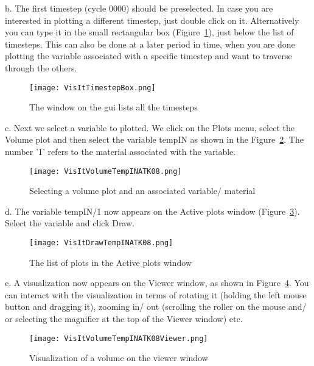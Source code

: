 b. The first timestep (cycle 0000) should be preselected. In case you are interested in plotting a different timestep, just double click on it. Alternatively you can type it in the small rectangular box (Figure~\ref{VisItTimestepBox}), just below the list of timesteps. This can also be done at a later period in time, when you are done plotting the variable associated with a specific timestep and want to traverse through the others.

\begin{figure}
  \center
  \texttt{[image: VisItTimestepBox.png]}
  \caption{The window on the gui lists all the timesteps}
  \label{VisItTimestepBox}
\end{figure}

c. Next we select a variable to plotted. We click on the Plots menu, select the Volume plot and then select the variable tempIN as shown in the Figure~\ref{VisItVolumeTempINATK08}. The number '1' refers to the material associated with the variable.

\begin{figure}
  \center
  \texttt{[image: VisItVolumeTempINATK08.png]}
  \caption{Selecting a volume plot and an associated variable/ material}
  \label{VisItVolumeTempINATK08}
\end{figure}

d. The variable tempIN/1 now appears on the Active plots window (Figure~\ref{VisItDrawTempINATK08}). Select the variable and click Draw.

\begin{figure}
  \center
  \texttt{[image: VisItDrawTempINATK08.png]}
  \caption{The list of plots in the Active plots window}
  \label{VisItDrawTempINATK08}
\end{figure}

e. A visualization now appears on the Viewer window, as shown in Figure~\ref{VisItVolumeTempINATK08Viewer}. You can interact with the visualization in terms of rotating it (holding the left mouse button and dragging it), zooming in/ out (scrolling the roller on the mouse and/ or selecting the magnifier at the top of the Viewer window) etc.

\begin{figure}
  \center
  \texttt{[image: VisItVolumeTempINATK08Viewer.png]}
  \caption{Visualization of a volume on the viewer window}
  \label{VisItVolumeTempINATK08Viewer}
\end{figure}

